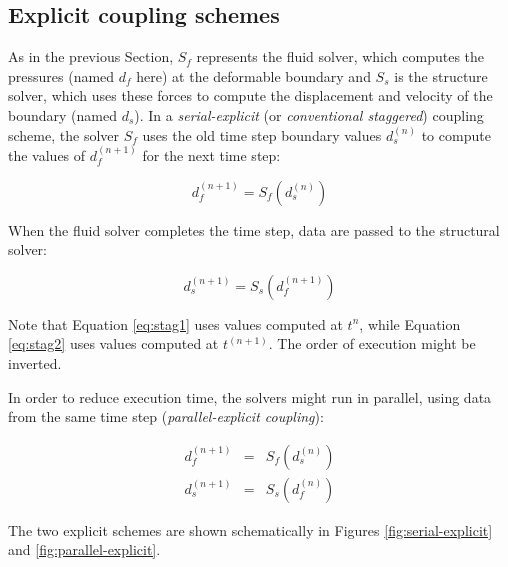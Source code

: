 \subsection{Explicit coupling schemes}
\label{subsec:explicit}

As in the previous Section, $S_f$ represents the fluid solver, which computes the pressures (named $d_f$ here) at the deformable boundary and $S_s$ is the structure solver, which uses these forces to compute the displacement and velocity of the boundary (named $d_s$). In a \textit{serial-explicit} (or \textit{conventional staggered}) coupling scheme, the solver $S_f$ uses the old time step boundary values $d_s^{(n)}$ to compute the values of $d_f^{(n+1)}$ for the next time step:

\begin{equation}
	d_f^{(n+1)} = S_f\left(d_s^{(n)}\right)
	\label{eq:stag1}
\end{equation}

When the fluid solver completes the time step, data are passed to the structural solver:

\begin{equation}
	d_s^{(n+1)} = S_s\left( d_f^{(n+1)} \right)
	\label{eq:stag2}
\end{equation}

Note that Equation \ref{eq:stag1} uses values computed at $t^n$, while Equation \ref{eq:stag2} uses values computed at $t^{(n+1)}$. The order of execution might be inverted.

In order to reduce execution time, the solvers might run in parallel, using data from the same time step (\textit{parallel-explicit coupling}):

\begin{subequations}
\begin{eqnarray}
	d_f^{(n+1)} &=& S_f\left(d_s^{(n)}\right) \\
	d_s^{(n+1)} &=& S_s\left( d_f^{(n)} \right)
	\label{eq:par-exp}
\end{eqnarray} 
\end{subequations}


The two explicit schemes are shown schematically in Figures \ref{fig:serial-explicit} and \ref{fig:parallel-explicit}.

